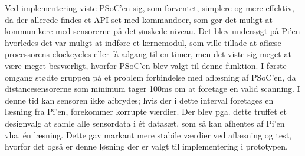 Ved implementering viste PSoC'en sig, som forventet, simplere og mere effektiv, da der allerede findes et API-set med \IIC kommandoer, som gør det muligt at kommunikere med sensorerne på det ønskede niveau. 
Det blev undersøgt på Pi'en hvorledes det var muligt at indføre et kernemodul, som ville tillade at aflæse processorens clockcycles eller få adgang til en timer, men det viste sig meget at være meget besværligt, hvorfor PSoC'en blev valgt til denne funktion. 
I første omgang stødte gruppen på et problem forbindelse med aflæsning af PSoC'en, da distancesensorerne som minimum tager 100ms om at foretage en valid scanning. I denne tid kan sensoren ikke afbrydes; hvis der i dette interval foretages en læsning fra Pi'en, forekommer korrupte værdier. 
Der blev pga. dette truffet et designvalg at samle alle sensordata i ét datasæt, som så kan afhentes af Pi'en vha. én læsning.
Dette gav markant mere stabile værdier ved aflæsning og test, hvorfor det også er denne løsning der er valgt til implementering i prototypen.